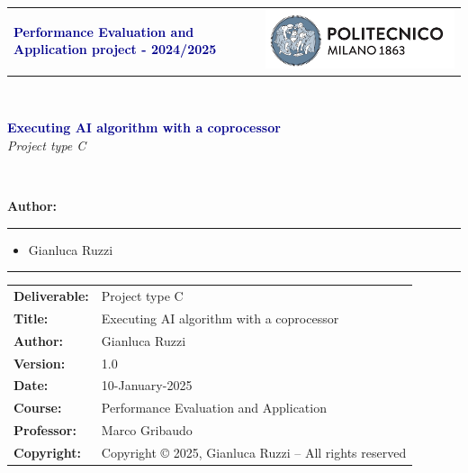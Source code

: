 \documentclass[11pt,twoside]{article}
\begin{document}
\begin{titlepage}
{\begin{table}[t!]
\centering
\begin{tabu} to \textwidth { X[1.0,r,p] X[1.7,l,p] }
\textcolor{Blue}
{\textcolor{darkblue}{\textbf{\small{Performance Evaluation and Application project - 2024/2025}}}} & \includegraphics[scale=0.8]{images/PolimiLogo}
\end{tabu}
\end{table}}~\\ [4 cm]


\begin{center} %
{\textcolor{darkblue}{\textbf{\Huge{Executing AI algorithm with a coprocessor}}}} \\ [1cm]
{\textit{\huge{Project type C}}} 
\end{center}~\\ [3 cm]


\begin{center}
\textbf{\huge{Author:}} \\ [1 cm]
\end{center}

\hrule
\begin{itemize}
\item {\Large Gianluca Ruzzi}
\end{itemize}
\hrule

\end{titlepage}








\begin{table}[h!]
\begin{tabu} to \textwidth { X[0.3,r,p] X[0.7,l,p] }
\hline
\textbf{Deliverable:} & Project type C\\
\textbf{Title:} & Executing AI algorithm with a coprocessor \\
\textbf{Author:} & Gianluca Ruzzi \\
\textbf{Version:} & 1.0 \\ 
\textbf{Date:} & 10-January-2025 \\
\textbf{Course:} & Performance Evaluation and Application\\
\textbf{Professor:} & Marco Gribaudo \\
\textbf{Copyright:} & Copyright © 2025, Gianluca Ruzzi – All rights reserved \\
\hline
\end{tabu}
\end{table}
\end{document}
